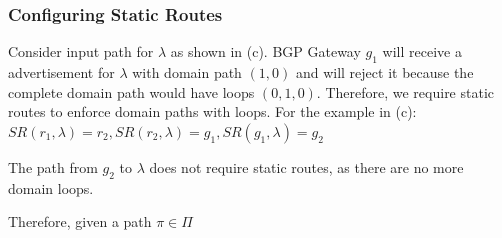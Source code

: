 \subsubsection{Configuring Static Routes} \label{sec:static}
Consider input path for $\lambda$ 
as shown in (c). BGP Gateway $g_1$ 
will receive a advertisement for $\lambda$ with domain
path $(1,0)$ and will reject it because the complete
domain path would have loops $(0,1,0)$. 
Therefore, we require static routes 
to enforce domain paths with loops. For the example in 
(c): \\
\hspace*{0.7cm}$SR(r_1,\lambda) = r_2, SR(r_2,\lambda) = g_1, SR(g_1,\lambda) = g_2$ 

\noindent The path from $g_2$ to $\lambda$ does not 
require static routes, as there are no more domain loops.

Therefore, given a path $\pi \in \Pi$





